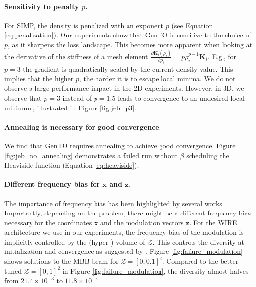 \paragraph{Sensitivity to penalty $p$.}
For SIMP, the density is penalized with an exponent $p$ (see Equation \ref{eq:penalization}).
Our experiments show that GenTO is sensitive to the choice of $p$, as it sharpens the loss landscape.
This becomes more apparent when looking at the derivative of the stiffness of a mesh element $\frac{\partial \mathbf{K}_i(\rho_i)}{\partial \rho_i} = p \rho_i^{p-1} \mathbf{K}_i$.
E.g., for $p=3$ the gradient is quadratically scaled by the current density value. 
This implies that the higher $p$, the harder it is to escape local minima.
We do not observe a large performance impact in the 2D experiments. However, in 3D, we observe that $p=3$ instead of $p=1.5$ leads to convergence to an undesired local minimum, illustrated in Figure \ref{fig:jeb_p3}.


\paragraph{Annealing is necessary for good convergence.}
We find that GenTO requires annealing to achieve good convergence.
Figure \ref{fig:jeb_no_annealing} demonstrates a failed run without $\beta$ scheduling the Heaviside function (Equation \ref{eq:heaviside}).



\paragraph{Different frequency bias for $\mathbf{x}$ and $\mathbf{z}$.}
The importance of frequency bias has been highlighted by several works \citep{sitzmann2019siren,saragadam2023wire}.
Importantly, depending on the problem, there might be a different frequency bias necessary for the coordinates $\mathbf{x}$ and the modulation vectors $\mathbf{z}$.
For the WIRE architecture we use in our experiments, the frequency bias of the modulation is implicitly controlled by the (hyper-) volume of $\mathcal{Z}$. 
This controls the diversity at initialization and convergence as suggested by \citet{Teney2024NeuralRR}.
Figure \ref{fig:failure_modulation} shows solutions to the MBB beam for $\mathcal{Z} = [0,0.1]^2$.
Compared to the better tuned $\mathcal{Z} = [0,1]^2$ in Figure \ref{fig:failure_modulation}, the diversity almost halves from $21.4 \times 10^{-3}$ to $11.8 \times 10^{-3}$.


